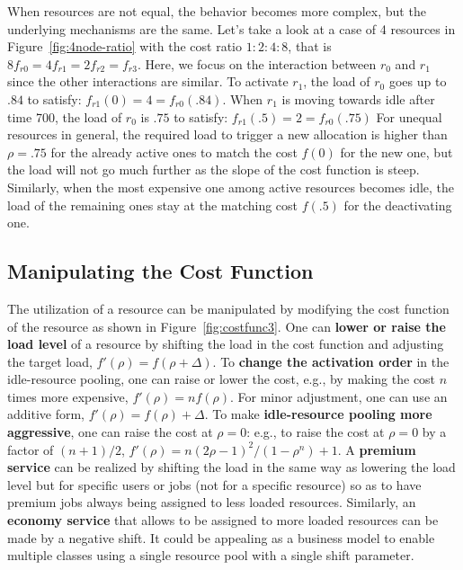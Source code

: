 When resources are not equal, the behavior becomes more complex, but
the underlying mechanisms are the same.
Let's take a look at a case of 4 resources in Figure~\ref{fig:4node-ratio}
with the cost ratio $1:2:4:8$,
that is $8 f_{r0} = 4 f_{r1} = 2 f_{r2} = f_{r3}$.
Here, we focus on the interaction between $r_{0}$ and $r_{1}$ since
the other interactions are similar.
To activate $r_{1}$, the load of $r_{0}$ goes up to $.84$ to satisfy:
$f_{r1}(0) = 4 = f_{r0}(.84)$.
When $r_{1}$ is moving towards idle after time 700, the load
of $r_{0}$ is $.75$ to satisfy: $f_{r1}(.5) = 2 = f_{r0}(.75)$
For unequal resources in general, the required load to trigger a new
allocation is higher than $\rho = .75$ for the already
active ones to match the cost $f(0)$ for the new one, but the load
will not go much further as the slope of the cost function is steep.
Similarly, when the most expensive one among active resources becomes
idle, the load of the remaining ones stay at the matching cost
$f(.5)$ for the deactivating one.


\subsection{Manipulating the Cost Function}
\label{sec:variation}

The utilization of a resource can be manipulated by modifying the cost
function of the resource as shown in Figure~\ref{fig:costfunc3}.
One can {\bf lower or raise the load level} of a resource by shifting
the load in the cost function and adjusting the target load,
$f'(\rho) = f(\rho + \Delta)$.
To {\bf change the activation order} in the idle-resource pooling,
one can raise or lower the cost,
e.g., by making the cost  $n$ times more expensive, $f'(\rho) = n f(\rho)$.
For minor adjustment, one can use an additive form,
$f'(\rho) = f(\rho) + \Delta$.
To make {\bf idle-resource pooling more aggressive},
one can raise the cost at $\rho = 0$:
e.g., to raise the cost at $\rho = 0$ by a factor of $(n+1)/2$,
$f'(\rho) = n (2\rho - 1)^{2}/(1 - \rho^{n}) + 1$.
A {\bf premium service} can be realized by shifting the load
in the same way as lowering the load level
but for specific users or jobs (not for a specific resource) so as to
have premium jobs always being assigned to less loaded resources.
Similarly, an {\bf economy service} that allows to be assigned to more
loaded resources can be made by a negative shift.
It could be appealing as a business model to enable multiple classes using a single
resource pool with a single shift parameter.


